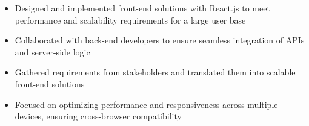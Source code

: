\par\bigskip
{}
\par\smallskip
\begin{minipage}{13.75cm}
  \begin{minipage}{6.5cm}
    \begin{itemize}
      \item Designed and implemented front-end solutions with React.js to meet performance and scalability requirements for a large user base
      \item Collaborated with back-end developers to ensure seamless integration of APIs and server-side logic
    \end{itemize}
  \end{minipage}
  \hfill
  \begin{minipage}{6.5cm}
    \begin{itemize}
      \item Gathered requirements from stakeholders and translated them into scalable front-end solutions
      \item Focused on optimizing performance and responsiveness across multiple devices, ensuring cross-browser compatibility
    \end{itemize}
  \end{minipage}
\end{minipage}
\par\smallskip
\divider

